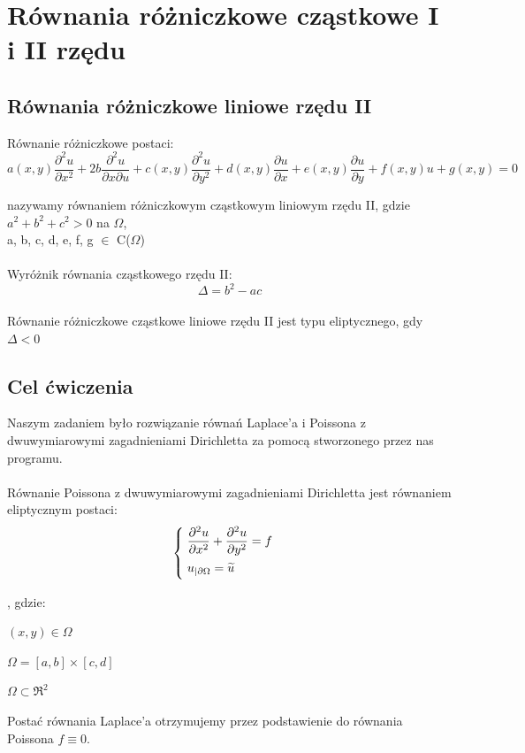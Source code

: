\section{Równania różniczkowe cząstkowe I i II rzędu}
\subsection{Równania różniczkowe liniowe rzędu II}
Równanie różniczkowe postaci:
$$ a(x,y) \dfrac{\partial^2u}{\partial x^2} + 2b \dfrac{\partial ^2u}{\partial x \partial u} + c(x,y)\dfrac{\partial^2u}{\partial y^2} + d(x,y) \dfrac{\partial u}{\partial x} + e(x,y) \dfrac{\partial u}{\partial y} + f(x,y) u + g(x,y) = 0$$

nazywamy równaniem różniczkowym cząstkowym liniowym rzędu II, gdzie $a^2 + b^2 + c^2>0$ na $\Omega$,\\ a, b, c, d, e, f, g $\in$ C($\Omega$)
\\
\\
Wyróżnik równania cząstkowego rzędu II:
$$\Delta = b^2 - ac$$\\
Równanie różniczkowe cząstkowe liniowe rzędu II jest typu eliptycznego, gdy $\Delta < 0$

\subsection{Cel ćwiczenia}
Naszym zadaniem było rozwiązanie równań Laplace'a i Poissona z dwuwymiarowymi zagadnieniami Dirichletta za pomocą stworzonego przez nas programu.
\\
\\
Równanie Poissona z dwuwymiarowymi zagadnieniami Dirichletta jest równaniem eliptycznym postaci:
\[
\begin{cases}
\vspace{0.1cm} 
\hspace{0,1cm}\dfrac{\partial^2 u}{\partial x^2} + \dfrac{\partial^2 u}{\partial y^2} = f\\
\vspace{0.1cm}
\hspace{0,1cm}u_{|\partial \Omega} = \widetilde{u} \\
\end{cases}
\]

, gdzie:

$(x,y) \in \Omega$

$\Omega = [a,b] \times [c,d]$

$\Omega \subset \Re^2$

Postać równania Laplace'a otrzymujemy przez podstawienie do równania Poissona $f \equiv 0$. \\

